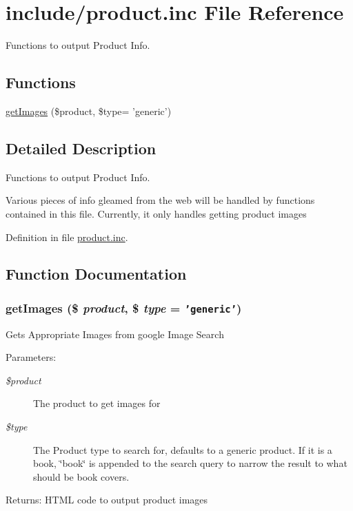 \hypertarget{product_8inc}{
\section{include/product.inc File Reference}
\label{product_8inc}
}
Functions to output Product Info. 

\subsection*{Functions}
\begin{CompactItemize}
\item 
\hyperlink{product_8inc_ac7b378120072ec50fd998c962a419a2}{getImages} (\$product, \$type= 'generic')
\end{CompactItemize}


\subsection{Detailed Description}
Functions to output Product Info. 

Various pieces of info gleamed from the web will be handled by functions contained in this file. Currently, it only handles getting product images 

Definition in file \hyperlink{product_8inc-source}{product.inc}.

\subsection{Function Documentation}
\hypertarget{product_8inc_ac7b378120072ec50fd998c962a419a2}{
\subsubsection{\setlength{\rightskip}{0pt plus 5cm}getImages (\$ {\em product}, \$ {\em type} = {\tt 'generic'})}}
\label{product_8inc_ac7b378120072ec50fd998c962a419a2}


Gets Appropriate Images from google Image Search \begin{Desc}
\item[Parameters:]
\begin{description}
\item[{\em \$product}]The product to get images for \item[{\em \$type}]The Product type to search for, defaults to a generic product. If it is a book, \char`\"{}book\char`\"{} is appended to the search query to narrow the result to what should be book covers. \end{description}
\end{Desc}
\begin{Desc}
\item[Returns:]HTML code to output product images \end{Desc}


